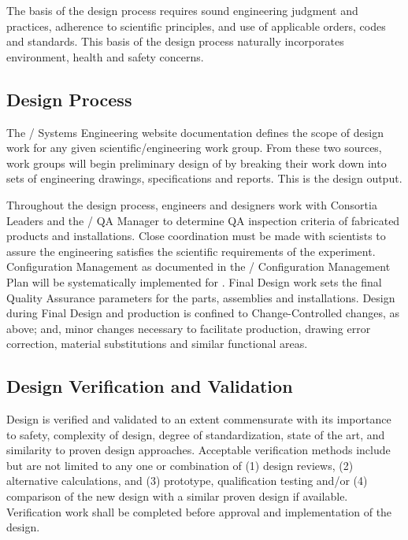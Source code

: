 The basis of the design process requires sound engineering judgment
and practices, adherence to scientific principles, and use of
applicable orders, codes and standards. This basis of the design
process naturally incorporates environment, health and safety
concerns.

\subsection{Design Process}

The / Systems Engineering website documentation defines the
scope of design work for any given scientific/engineering work
group. From these two sources, work groups will begin preliminary
design of  by breaking their work down into sets of engineering
drawings, specifications and reports. This is the design output.

Throughout the design process, engineers and designers work with
Consortia Leaders and the / QA Manager to determine QA
inspection criteria of fabricated products and installations. Close
coordination must be made with  scientists to assure the
engineering satisfies the scientific requirements of the
experiment. Configuration Management as documented in the /
Configuration Management Plan will be systematically implemented for
. Final Design work sets the final Quality Assurance parameters
for the parts, assemblies and installations. Design during Final
Design and production is confined to Change-Controlled changes, as
above; and, minor changes necessary to facilitate production, drawing
error correction, material substitutions and similar functional areas.

\subsection{Design Verification and Validation}

Design is verified and validated to an extent commensurate with its
importance to safety, complexity of design, degree of standardization,
state of the art, and similarity to proven design
approaches. Acceptable verification methods include but are not
limited to any one or combination of (1) design reviews, (2)
alternative calculations, and (3) prototype, qualification testing
and/or (4) comparison of the new design with a similar proven design
if available. Verification work shall be completed before approval and
implementation of the design.

